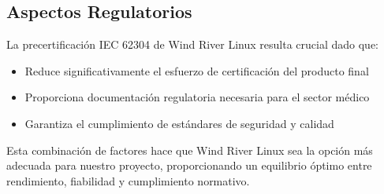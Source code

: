     \subsection{Aspectos Regulatorios}
        La precertificación IEC 62304 de Wind River Linux resulta crucial dado que:
        \begin{itemize}
            \item Reduce significativamente el esfuerzo de certificación del producto final
            \item Proporciona documentación regulatoria necesaria para el sector médico
            \item Garantiza el cumplimiento de estándares de seguridad y calidad
        \end{itemize}

    Esta combinación de factores hace que Wind River Linux sea la opción más adecuada para nuestro proyecto, proporcionando un equilibrio óptimo entre rendimiento, fiabilidad y cumplimiento normativo.
